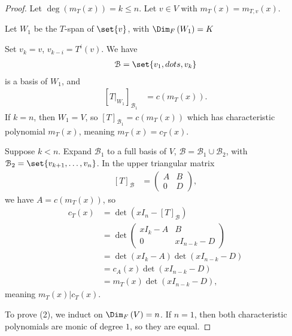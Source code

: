 \documentclass[10pt]{mypackage}
\begin{document}
\begin{proof}
  Let $\deg\left(m_{T}(x)\right) = k \leq n$. Let $v\in V$ with $m_{T}(x) = m_{T,v}(x)$.\newline

  Let $W_1$ be the $T$-span of $\set{v}$, with $\Dim_{F}\left(W_1\right) = K$\newline

  Set $v_k = v$, $v_{k-i} = T^{i}\left(v\right)$. We have
  \begin{align*}
    \mathcal{B} = \set{v_1,dots,v_k}
  \end{align*}
  is a basis of $W_1$, and
  \begin{align*}
    \left[T\bigr\vert_{W_1}\right]_{\mathcal{B}_1} &= c\left(m_{T}(x)\right).
  \end{align*}
  If $k = n$, then $W_1 = V$, so $\left[T\right]_{\mathcal{B}_1} = c\left(m_T(x)\right)$ which has characteristic polynomial $m_T(x)$,  meaning $m_T(x) = c_T(x)$.\newline

  Suppose $k < n$. Expand $\mathcal{B}_1$ to a full basis of $V$, $\mathcal{B} = \mathcal{B}_1 \cup \mathcal{B}_2$, with $\mathcal{B}_2 = \set{v_{k+1},\dots,v_{n}}$. In the upper triangular matrix
  \begin{align*}
    \left[T\right]_{\mathcal{B}} &= \begin{pmatrix}A & B \\ 0 & D\end{pmatrix},
  \end{align*}
  we have $A = c\left(m_{T}(x)\right)$, so
  \begin{align*}
    c_{T}(x) &= \det\left(xI_n - \left[T\right]_{\mathcal{B}}\right)\\
             &= \det\begin{pmatrix}xI_k - A & B \\ 0 & xI_{n-k}-D\end{pmatrix}\\
             &= \det\left(xI_{k} - A\right)\det\left(xI_{n-k}-D\right)\\
             &= c_{A}(x)\det\left(xI_{n-k}-D\right)\\
             &= m_{T}(x)\det\left(xI_{n-k}-D\right),
  \end{align*}
  meaning $m_{T}(x)|c_T(x)$.\newline

  To prove (2), we induct on $\Dim_{F}\left(V\right) = n$. If $n=1$, then both characteristic polynomials are monic of degree $1$, so they are equal.\newline


\end{proof}
\end{document}
